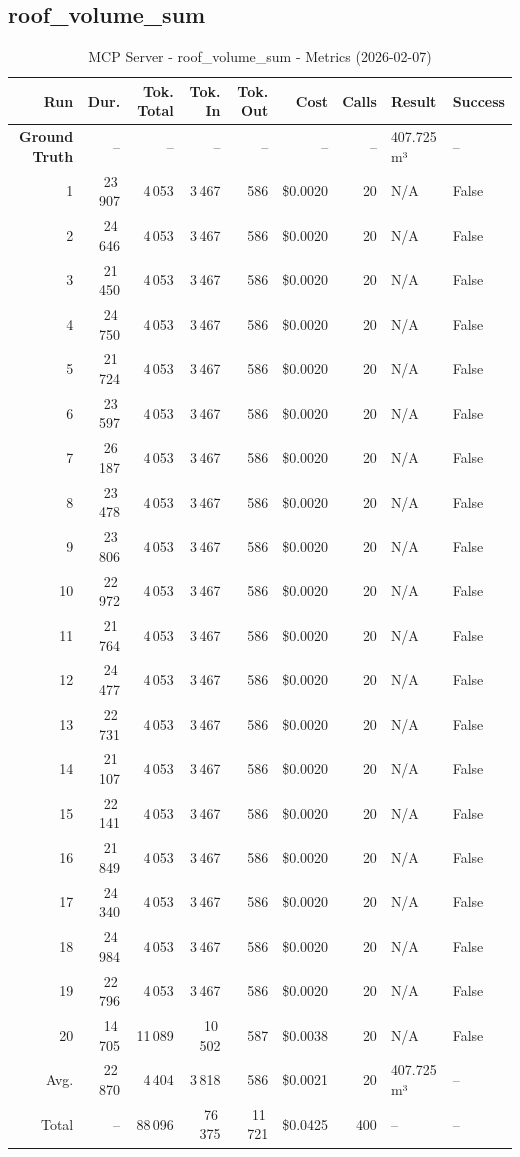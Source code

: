 \documentclass[a4paper,11pt]{article}
\begin{document}
\clearpage
\subsection{roof\_volume\_sum}

\begin{table}[ht]
\centering
\scriptsize
\caption{MCP Server - roof\_volume\_sum - Metrics (2026-02-07)}
\label{tab:mcp\_roof\_volume\_sum\_metrics\_2026-02-07}
\begin{tabular}{r r r r r r r p{3cm} l}
\hline
Run & Dur. & Tok. Total & Tok. In & Tok. Out & Cost & Calls & Result & Success \\
\hline
\textbf{Ground Truth} & -- & -- & -- & -- & -- & -- & 407.725 m³ & -- \\
1 & 23\,907 & 4\,053 & 3\,467 & 586 & \$0.0020 & 20 & N/A & False \\
2 & 24\,646 & 4\,053 & 3\,467 & 586 & \$0.0020 & 20 & N/A & False \\
3 & 21\,450 & 4\,053 & 3\,467 & 586 & \$0.0020 & 20 & N/A & False \\
4 & 24\,750 & 4\,053 & 3\,467 & 586 & \$0.0020 & 20 & N/A & False \\
5 & 21\,724 & 4\,053 & 3\,467 & 586 & \$0.0020 & 20 & N/A & False \\
6 & 23\,597 & 4\,053 & 3\,467 & 586 & \$0.0020 & 20 & N/A & False \\
7 & 26\,187 & 4\,053 & 3\,467 & 586 & \$0.0020 & 20 & N/A & False \\
8 & 23\,478 & 4\,053 & 3\,467 & 586 & \$0.0020 & 20 & N/A & False \\
9 & 23\,806 & 4\,053 & 3\,467 & 586 & \$0.0020 & 20 & N/A & False \\
10 & 22\,972 & 4\,053 & 3\,467 & 586 & \$0.0020 & 20 & N/A & False \\
11 & 21\,764 & 4\,053 & 3\,467 & 586 & \$0.0020 & 20 & N/A & False \\
12 & 24\,477 & 4\,053 & 3\,467 & 586 & \$0.0020 & 20 & N/A & False \\
13 & 22\,731 & 4\,053 & 3\,467 & 586 & \$0.0020 & 20 & N/A & False \\
14 & 21\,107 & 4\,053 & 3\,467 & 586 & \$0.0020 & 20 & N/A & False \\
15 & 22\,141 & 4\,053 & 3\,467 & 586 & \$0.0020 & 20 & N/A & False \\
16 & 21\,849 & 4\,053 & 3\,467 & 586 & \$0.0020 & 20 & N/A & False \\
17 & 24\,340 & 4\,053 & 3\,467 & 586 & \$0.0020 & 20 & N/A & False \\
18 & 24\,984 & 4\,053 & 3\,467 & 586 & \$0.0020 & 20 & N/A & False \\
19 & 22\,796 & 4\,053 & 3\,467 & 586 & \$0.0020 & 20 & N/A & False \\
20 & 14\,705 & 11\,089 & 10\,502 & 587 & \$0.0038 & 20 & N/A & False \\
\hline
Avg. & 22\,870 & 4\,404 & 3\,818 & 586 & \$0.0021 & 20 & 407.725 m³ & -- \\
Total & -- & 88\,096 & 76\,375 & 11\,721 & \$0.0425 & 400 & -- & -- \\
\hline
\end{tabular}
\end{table}
\end{document}

